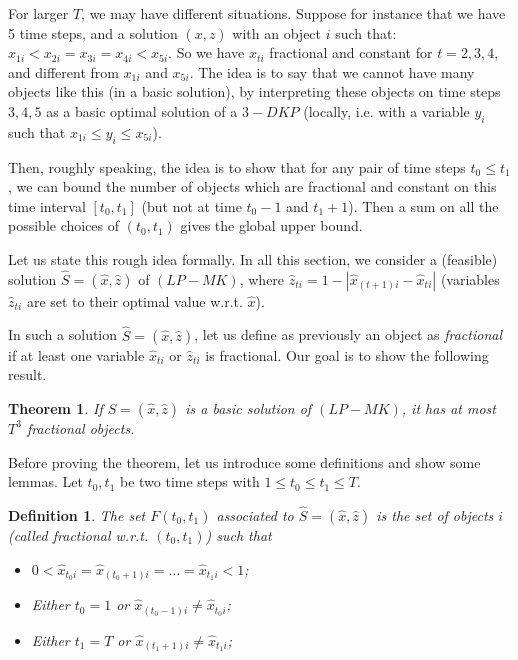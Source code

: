 \documentclass[a4paper]{book}
\newtheorem{theorem}{Theorem}[chapter]
\newtheorem{definition}{Definition}
\begin{document}
For larger $T$, we may have different situations. Suppose for instance that we have 5 time steps, and a solution $(x,z)$ with an object $i$ such that: $x_{1i}<x_{2i}=x_{3i}=x_{4i}<x_{5i}$. So we have $x_{ti}$ fractional and constant for $t=2,3,4$, and different from $x_{1i}$ and $x_{5i}$. The idea is to say that we cannot have many objects like this (in a basic solution), by interpreting these objects on time steps $3,4,5$ as a basic optimal solution of a $3-DKP$ (locally, i.e. with a variable $y_i$ such that $x_{1i}\leq y_i\leq x_{5i}$).  

Then, roughly speaking, the idea is to show that for any pair of time steps $t_0\leq t_1$, we can bound the number of objects which are fractional and constant on this time interval $[t_0,t_1]$ (but not at time $t_0-1$ and $t_1+1$). Then a sum on all the possible choices of $(t_0,t_1)$ gives the global upper bound.

Let us state this rough idea formally. In all this section, we consider a (feasible) solution $\hat{S}=(\hat{x},\hat{z})$ of $(LP-MK)$, where $\hat{z}_{ti}=1-|\hat{x}_{(t+1)i}-\hat{x}_{ti}|$ (variables $\hat{z}_{ti}$ are set to their optimal value w.r.t. $\hat{x}$). 

In such a solution $\hat{S}=(\hat{x},\hat{z})$, let us define as previously an object as {\it fractional} if at least one variable $\hat{x}_{ti}$ or $\hat{z}_{ti}$ is fractional.  Our goal is to show the following result. 

\begin{theorem}\label{theo:frac}
If $\hat{S}=(\hat{x},\hat{z})$ is a basic solution of $(LP-MK)$, it has at most $T^3$ fractional objects. 
\end{theorem}

Before proving the theorem, let us introduce some definitions and show some lemmas. Let $t_0,t_1$ be two time steps with $1\leq t_0\leq t_1 \leq T$. 

\begin{definition}\label{def:f}
	The set $F(t_0,t_1)$ associated to $\hat{S}=(\hat{x},\hat{z})$ is the set of objects $i$ (called fractional w.r.t. $(t_0,t_1)$) such that 
	\begin{itemize}
		\item $0<\hat{x}_{t_0i}=\hat{x}_{(t_0+1)i}=\dots = \hat{x}_{t_1i}<1$;
		\item Either $t_0=1$ or $\hat{x}_{(t_0-1)i}\neq \hat{x}_{t_0i}$;
		\item Either $t_1=T$ or $\hat{x}_{(t_1+1)i}\neq \hat{x}_{t_1i}$;
	\end{itemize}
\end{definition}
\end{document}
